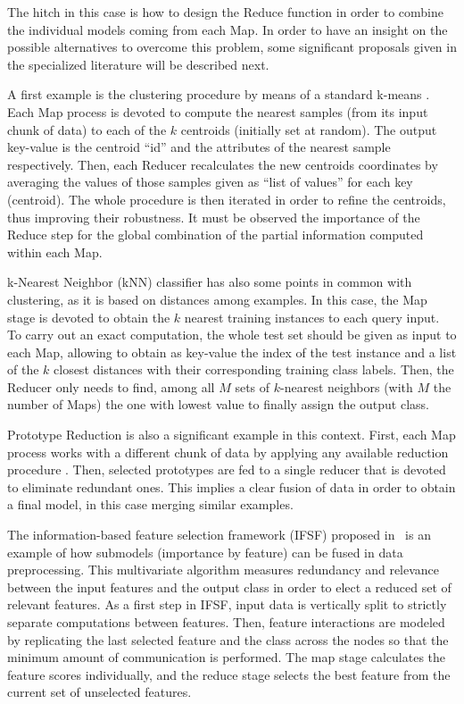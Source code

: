 \documentclass[3p,review]{elsarticle}
\begin{document}
The hitch in this case is how to design the Reduce function in order to combine the individual models coming from each Map. In order to have an insight on the possible alternatives to overcome this problem, some significant proposals given in the specialized literature will be described next.

A first example is the clustering procedure by means of a standard k-means \cite{Zhao09-kMeans}. Each Map process is devoted to compute the nearest samples (from its input chunk of data) to each of the $k$ centroids (initially set at random). The output key-value is the centroid ``id'' and the attributes of the nearest sample respectively. Then, each Reducer recalculates the new centroids coordinates by averaging the values of those samples given as ``list of values'' for each key (centroid). The whole procedure is then iterated in order to refine the centroids, thus improving their robustness. It must be observed the importance of the Reduce step for the global combination of the partial information computed within each Map.  

k-Nearest Neighbor (kNN) classifier \cite{MailloRTH17-kNN} has also some points in common with clustering, as it is based on distances among examples. In this case, the Map stage is devoted to obtain the $k$ nearest training instances to each query input. To carry out an exact computation, the whole test set should be given as input to each Map, allowing to obtain as key-value the index of the test instance and a list of the $k$ closest distances with their corresponding training class labels. Then, the Reducer only needs to find, among all $M$ sets of $k$-nearest neighbors (with $M$ the number of Maps) the one with lowest value to finally assign the output class.

Prototype Reduction \cite{TrigueroPBGH15-PR} is also a significant example in this context. First, each Map process works with a different chunk of data by applying any available reduction procedure \cite{TrigueroDGH12}. Then, selected prototypes are fed to a single reducer that is devoted to eliminate redundant ones. This implies a clear fusion of data in order to obtain a final model, in this case merging similar examples. 

The information-based feature selection framework (IFSF) proposed in~\cite{Ramirez-Gallego17-mrmr} is an example of how submodels (importance by feature) can be fused in data preprocessing. This multivariate algorithm measures redundancy and relevance between the input features and the output class in order to elect a reduced set of relevant features. As a first step in IFSF, input data is vertically split to strictly separate computations between features. Then, feature interactions are modeled by replicating the last selected feature and the class across the nodes so that the minimum amount of communication is performed. The map stage calculates the feature scores individually, and the reduce stage selects the best feature from the current set of unselected features.
\end{document}
